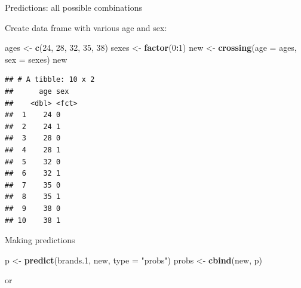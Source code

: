 \documentclass[ignorenonframetext,]{beamer}
\newenvironment{Shaded}{\begin{snugshade}}{\end{snugshade}}
\newcommand{\DataTypeTok}[1]{\textcolor[rgb]{0.13,0.29,0.53}{#1}}
\newcommand{\DecValTok}[1]{\textcolor[rgb]{0.00,0.00,0.81}{#1}}
\newcommand{\FloatTok}[1]{\textcolor[rgb]{0.00,0.00,0.81}{#1}}
\newcommand{\KeywordTok}[1]{\textcolor[rgb]{0.13,0.29,0.53}{\textbf{#1}}}
\newcommand{\NormalTok}[1]{#1}
\newcommand{\OperatorTok}[1]{\textcolor[rgb]{0.81,0.36,0.00}{\textbf{#1}}}
\newcommand{\StringTok}[1]{\textcolor[rgb]{0.31,0.60,0.02}{#1}}
\begin{document}
\begin{frame}[fragile]{Predictions: all possible combinations}
\protect\hypertarget{predictions-all-possible-combinations}{}

Create data frame with various age and sex:

\footnotesize

\begin{Shaded}
\begin{Highlighting}[]
\NormalTok{ages <-}\StringTok{ }\KeywordTok{c}\NormalTok{(}\DecValTok{24}\NormalTok{, }\DecValTok{28}\NormalTok{, }\DecValTok{32}\NormalTok{, }\DecValTok{35}\NormalTok{, }\DecValTok{38}\NormalTok{)}
\NormalTok{sexes <-}\StringTok{ }\KeywordTok{factor}\NormalTok{(}\DecValTok{0}\OperatorTok{:}\DecValTok{1}\NormalTok{)}
\NormalTok{new <-}\StringTok{ }\KeywordTok{crossing}\NormalTok{(}\DataTypeTok{age =}\NormalTok{ ages, }\DataTypeTok{sex =}\NormalTok{ sexes)}
\NormalTok{new}
\end{Highlighting}
\end{Shaded}

\begin{verbatim}
## # A tibble: 10 x 2
##      age sex  
##    <dbl> <fct>
##  1    24 0    
##  2    24 1    
##  3    28 0    
##  4    28 1    
##  5    32 0    
##  6    32 1    
##  7    35 0    
##  8    35 1    
##  9    38 0    
## 10    38 1
\end{verbatim}

\normalsize

\end{frame}

\begin{frame}[fragile]{Making predictions}
\protect\hypertarget{making-predictions}{}

\begin{Shaded}
\begin{Highlighting}[]
\NormalTok{p <-}\StringTok{ }\KeywordTok{predict}\NormalTok{(brands}\FloatTok{.1}\NormalTok{, new, }\DataTypeTok{type =} \StringTok{"probs"}\NormalTok{)}
\NormalTok{probs <-}\StringTok{ }\KeywordTok{cbind}\NormalTok{(new, p)}
\end{Highlighting}
\end{Shaded}

or

\begin{Shaded}
\end{Shaded}

\end{frame}
\end{document}
